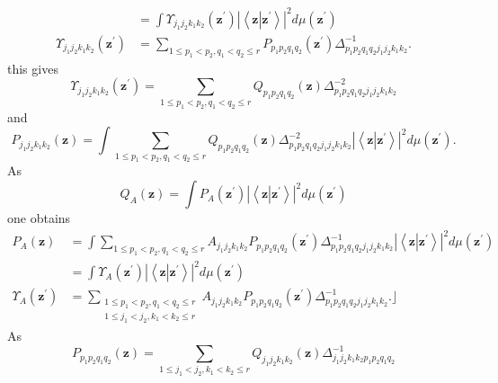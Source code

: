 \documentclass[aps,preprint]{revtex4}%
\begin{document}
\begin{align}
&  =\int\Upsilon_{j_{1}j_{2}k_{1}k_{2}}\left(  \mathbf{z}^{\prime}\right)
\left\vert \left\langle \mathbf{z}\left\vert \mathbf{z}^{\prime}\right.
\right\rangle \right\vert ^{2}d\mu\left(  \mathbf{z}^{\prime}\right)
\nonumber\\
\Upsilon_{j_{1}j_{2}k_{1}k_{2}}\left(  \mathbf{z}^{\prime}\right)   &
=\sum_{1\leq p_{1}<p_{2},q_{1}<q_{2}\leq r}P_{p_{1}p_{2}q_{1}q_{2}}\left(
\mathbf{z}^{\prime}\right)  \Delta_{p_{1}p_{2}q_{1}q_{2}j_{1}j_{2}k_{1}k_{2}%
}^{-1}.
\end{align}
this gives%
\begin{equation}
\Upsilon_{j_{1}j_{2}k_{1}k_{2}}\left(  \mathbf{z}^{\prime}\right)
=\sum_{1\leq p_{1}<p_{2},q_{1}<q_{2}\leq r}Q_{p_{1}p_{2}q_{1}q_{2}}\left(
\mathbf{z}\right)  \Delta_{p_{1}p_{2}q_{1}q_{2}j_{1}j_{2}k_{1}k_{2}}^{-2}%
\end{equation}
and
\begin{equation}
P_{j_{1}j_{2}k_{1}k_{2}}\left(  \mathbf{z}\right)  =\int\sum_{1\leq
p_{1}<p_{2},q_{1}<q_{2}\leq r}Q_{p_{1}p_{2}q_{1}q_{2}}\left(  \mathbf{z}%
\right)  \Delta_{p_{1}p_{2}q_{1}q_{2}j_{1}j_{2}k_{1}k_{2}}^{-2}\left\vert
\left\langle \mathbf{z}\left\vert \mathbf{z}^{\prime}\right.  \right\rangle
\right\vert ^{2}d\mu\left(  \mathbf{z}^{\prime}\right)  .
\end{equation}
As%
\begin{equation}
Q_{A}\left(  \mathbf{z}\right)  =\int P_{A}\left(  \mathbf{z}^{\prime}\right)
\left\vert \left\langle \mathbf{z}\left\vert \mathbf{z}^{\prime}\right.
\right\rangle \right\vert ^{2}d\mu\left(  \mathbf{z}^{\prime}\right)
\end{equation}
one obtains%
\begin{align}
P_{A}\left(  \mathbf{z}\right)   &  =\int\sum_{1\leq p_{1}<p_{2},q_{1}%
<q_{2}\leq r}A_{j_{1}j_{2}k_{1}k_{2}}P_{p_{1}p_{2}q_{1}q_{2}}\left(
\mathbf{z}^{\prime}\right)  \Delta_{p_{1}p_{2}q_{1}q_{2}j_{1}j_{2}k_{1}k_{2}%
}^{-1}\left\vert \left\langle \mathbf{z}\left\vert \mathbf{z}^{\prime}\right.
\right\rangle \right\vert ^{2}d\mu\left(  \mathbf{z}^{\prime}\right)
\nonumber\\
&  =\int\Upsilon_{A}\left(  \mathbf{z}^{\prime}\right)  \left\vert
\left\langle \mathbf{z}\left\vert \mathbf{z}^{\prime}\right.  \right\rangle
\right\vert ^{2}d\mu\left(  \mathbf{z}^{\prime}\right) \nonumber\\
\Upsilon_{A}\left(  \mathbf{z}^{\prime}\right)   &  =\sum_{\substack{1\leq
p_{1}<p_{2},q_{1}<q_{2}\leq r\\1\leq j_{1}<j_{2},k_{1}<k_{2}\leq r}%
}A_{j_{1}j_{2}k_{1}k_{2}}P_{p_{1}p_{2}q_{1}q_{2}}\left(  \mathbf{z}^{\prime
}\right)  \Delta_{p_{1}p_{2}q_{1}q_{2}j_{1}j_{2}k_{1}k_{2}}^{-1}.\rfloor
\end{align}
As%
\begin{equation}
P_{p_{1}p_{2}q_{1}q_{2}}\left(  \mathbf{z}\right)  =\sum_{1\leq j_{1}%
<j_{2},k_{1}<k_{2}\leq r}Q_{j_{1}j_{2}k_{1}k_{2}}\left(  \mathbf{z}\right)
\Delta_{j_{1}j_{2}k_{1}k_{2}p_{1}p_{2}q_{1}q_{2}}^{-1}\nonumber
\end{equation}


\subsection{}
\end{document}
